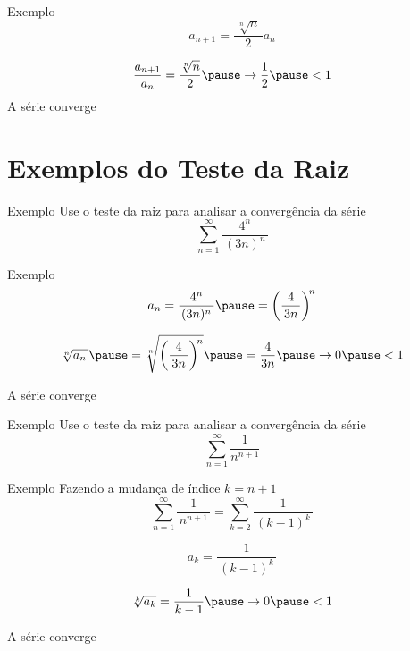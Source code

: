 \begin{frame}{Exemplo \theexemplo}
  \[
    a_{n+1} = \frac{\,\sqrt[n]{n}\,}{2} a_n
  \]

  \pause
  \[
    \frac{a_{n+1}}{a_n}
    = \frac{\sqrt[n]{n}}{2}
    \pause
    \to \frac{1}{2}
    \pause
    < 1
  \]
  A série converge
\end{frame}

\section{Exemplos do Teste da Raiz}

\addtocounter{exemplo}{1}
\begin{frame}{Exemplo \theexemplo}
  Use o teste da raiz para analisar a convergência da série
  \[
    \sum_{n=1}^\infty \frac{4^n}{\,(3n)^n\,}
  \]
\end{frame}

\begin{frame}{Exemplo \theexemplo}
  \[
    a_n
    = \frac{4^n}{\,(3n)^n\,}
    \pause
    = \left(\frac{4}{\,3n\,}\right)^{\!n}
  \]

  \pause
  \[
    \sqrt[n]{a_n\,}
    \pause
    = \sqrt[n]{\left(\frac{4}{\,3n\,}\right)^{\!n}}
    \pause
    = \frac{4}{3n}
    \pause
    \to 0
    \pause
    < 1
  \]

  A série converge
\end{frame}

\addtocounter{exemplo}{1}
\begin{frame}{Exemplo \theexemplo}
  Use o teste da raiz para analisar a convergência da série
  \[
    \sum_{n=1}^\infty\frac{1}{n^{n+1}}
  \]
\end{frame}

\begin{frame}{Exemplo \theexemplo}
  Fazendo a mudança de índice \(k=n+1\)
  \[
    \sum_{n=1}^\infty\frac{1}{\, n^{n+1}\,} =
    \sum_{k=2}^\infty\frac{1}{\,(k-1)^{k}\,}
  \]

  \pause
  \[
    a_k = \frac{1}{\,(k-1)^{k}\,}
  \]

  \pause
  \[
    \sqrt[k]{a_k}
    = \frac{1}{k-1}
    \pause
    \to 0
    \pause
    < 1
  \]

  A série converge
\end{frame}

